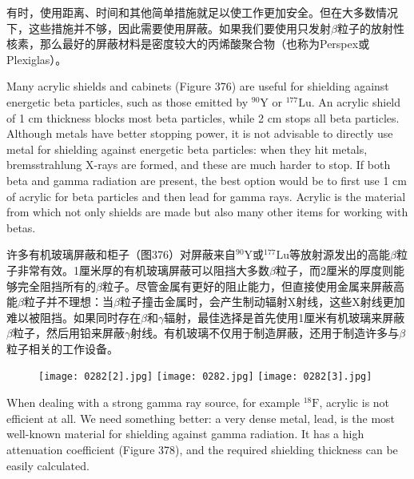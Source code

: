 \documentclass[dvipsnames, svgnames,a4paper,11pt]{article}
\begin{document}
有时，使用距离、时间和其他简单措施就足以使工作更加安全。但在大多数情况下，这些措施并不够，因此需要使用屏蔽。如果我们要使用只发射$\beta$粒子的放射性核素，那么最好的屏蔽材料是密度较大的丙烯酸聚合物（也称为Perspex或Plexiglas）。

Many acrylic shields and cabinets (Figure 376) are useful for shielding against energetic beta particles, such as those emitted by \(\mathrm{^{90}Y}\) or \(\mathrm{^{177}Lu}\). An acrylic shield of 1 cm thickness blocks most beta particles, while 2 cm stops all beta particles. Although metals have better stopping power, it is not advisable to directly use metal for shielding against energetic beta particles: when they hit metals, bremsstrahlung X-rays are formed, and these are much harder to stop. If both beta and gamma radiation are present, the best option would be to first use 1 cm of acrylic for beta particles and then lead for gamma rays. Acrylic is the material from which not only shields are made but also many other items for working with betas.

许多有机玻璃屏蔽和柜子（图376）对屏蔽来自\(\mathrm{^{90}Y}\)或\(\mathrm{^{177}Lu}\)等放射源发出的高能$\beta$粒子非常有效。1厘米厚的有机玻璃屏蔽可以阻挡大多数$\beta$粒子，而2厘米的厚度则能够完全阻挡所有的$\beta$粒子。尽管金属有更好的阻止能力，但直接使用金属来屏蔽高能$\beta$粒子并不理想：当$\beta$粒子撞击金属时，会产生制动辐射X射线，这些X射线更加难以被阻挡。如果同时存在$\beta$和$\gamma$辐射，最佳选择是首先使用1厘米有机玻璃来屏蔽$\beta$粒子，然后用铅来屏蔽$\gamma$射线。有机玻璃不仅用于制造屏蔽，还用于制造许多与$\beta$粒子相关的工作设备。

\begin{figure}[h]
    \centering
    \texttt{[image: 0282[2].jpg]} \hspace{0.1in}
    \texttt{[image: 0282.jpg]} \hspace{0.1in}
    \texttt{[image: 0282[3].jpg]}  
     \label{fig376}
\end{figure}

When dealing with a strong gamma ray source, for example \(\mathrm{^{18}F}\), acrylic is not efficient at all. We need something better: a very dense metal, lead, is the most well-known material for shielding against gamma radiation. It has a high attenuation coefficient (Figure 378), and the required shielding thickness can be easily calculated.
\end{document}
